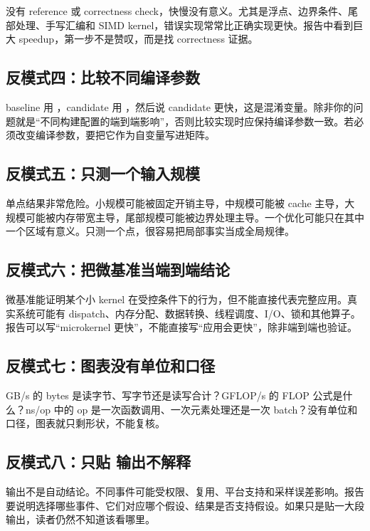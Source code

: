没有 reference 或 correctness check，快慢没有意义。尤其是浮点、边界条件、尾部处理、手写汇编和 SIMD kernel，错误实现常常比正确实现更快。报告中看到巨大 speedup，第一步不是赞叹，而是找 correctness 证据。

\subsection{反模式四：比较不同编译参数}

baseline 用 ，candidate 用 ，然后说 candidate 更快，这是混淆变量。除非你的问题就是“不同构建配置的端到端影响”，否则比较实现时应保持编译参数一致。若必须改变编译参数，要把它作为自变量写进矩阵。

\subsection{反模式五：只测一个输入规模}

单点结果非常危险。小规模可能被固定开销主导，中规模可能被 cache 主导，大规模可能被内存带宽主导，尾部规模可能被边界处理主导。一个优化可能只在其中一个区域有意义。只测一个点，很容易把局部事实当成全局规律。

\subsection{反模式六：把微基准当端到端结论}

微基准能证明某个小 kernel 在受控条件下的行为，但不能直接代表完整应用。真实系统可能有 dispatch、内存分配、数据转换、线程调度、I/O、锁和其他算子。报告可以写“microkernel 更快”，不能直接写“应用会更快”，除非端到端也验证。

\subsection{反模式七：图表没有单位和口径}

GB/s 的 bytes 是读字节、写字节还是读写合计？GFLOP/s 的 FLOP 公式是什么？ns/op 中的 op 是一次函数调用、一次元素处理还是一次 batch？没有单位和口径，图表就只剩形状，不能复核。

\subsection{反模式八：只贴  输出不解释}

 输出不是自动结论。不同事件可能受权限、复用、平台支持和采样误差影响。报告要说明选择哪些事件、它们对应哪个假设、结果是否支持假设。如果只是贴一大段输出，读者仍然不知道该看哪里。

